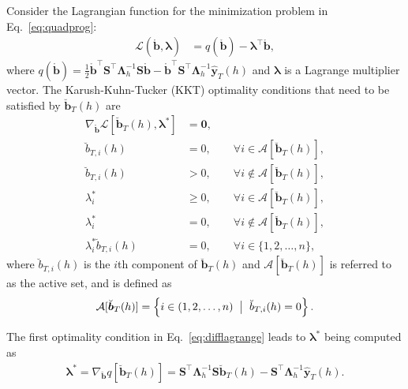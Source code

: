 \documentclass[twocolumn]{svjour3}
\begin{document}
Consider the Lagrangian function for the minimization problem in Eq.~\eqref{eq:quadprog}:
\begin{align*}
\mathcal{L}(\mathring{\bm{b}}, \bm{\lambda}) & = q(\mathring{\bm{b}}) - \bm{\lambda}^\top\mathring{\bm{b}},
\end{align*}
where $q(\mathring{\bm{b}}) = \frac{1}{2}\mathring{\bm{b}}^\top\bm{S}^\top\bm{\Lambda}^{-1}_{h}\bm{S}\mathring{\bm{b}} - \mathring{\bm{b}}^\top\bm{S}^\top\bm{\Lambda}^{-1}_{h}\hat{\bm{y}}_{T}(h)$ and $\bm{\lambda}$ is a Lagrange multiplier vector. The Karush-Kuhn-Tucker (KKT) optimality conditions that need to be satisfied by $\breve{\bm{b}}_{T}(h)$ are
\begin{subequations}
	\label{eq:optcond}
	\begin{align}
	\label{eq:difflagrange}
	\nabla_{\mathring{\bm{b}}} \mathcal{L}[\breve{\bm{b}}_{T}(h), \bm{\lambda}^{*}] & = \bm{0},                                                          \\
	\breve{b}_{T, i}(h)                                                  & = 0, \qquad \forall i \in \mathcal{A}[\breve{\bm{b}}_{T}(h)],      \\
	\breve{b}_{T, i}(h)                                                  & > 0, \qquad \forall i \notin \mathcal{A}[\breve{\bm{b}}_{T}(h)],   \\
	\lambda^{*}_{i}                                                      & \geq 0, \qquad \forall i \in \mathcal{A}[\breve{\bm{b}}_{T}(h)],   \\
	\lambda^{*}_{i}                                                      & = 0, \qquad \forall i \notin \mathcal{A}[\breve{\bm{b}}_{T}(h)],   \\
	\lambda_{i}^{*} \breve{b}_{T, i}(h)                                  & = 0, \qquad \forall i \in \{1, 2, \dots, n\}, \label{eq:kktcomple}
	\end{align}
\end{subequations}
where $\breve{b}_{T, i}(h)$ is the $i$th component of $\breve{\bm{b}}_{T}(h)$ and $\mathcal{A}[\breve{\bm{b}}_{T}(h)]$ is referred to as the active set, and is defined as
\begin{align*}
\mathcal{A}[\breve{\bm{b}}_{T}(h)] = \left\{i \in (1, 2, \dots, n) \hspace*{2mm} \big|\hspace*{2mm} \breve{b}_{T, i}(h) = 0\right\}.
\end{align*}

The first optimality condition in Eq.~\eqref{eq:difflagrange} leads to $\bm{\lambda}^{*}$ being computed as
\begin{align*}
\bm{\lambda}^{*} = \nabla_{\breve{\bm{b}}} q[\breve{\bm{b}}_{T}(h)] = \bm{S}^\top\bm{\Lambda}^{-1}_{h}\bm{S}\breve{\bm{b}}_{T}(h) - \bm{S}^\top\bm{\Lambda}^{-1}_{h}\hat{\bm{y}}_{T}(h).
\end{align*}
\end{document}
